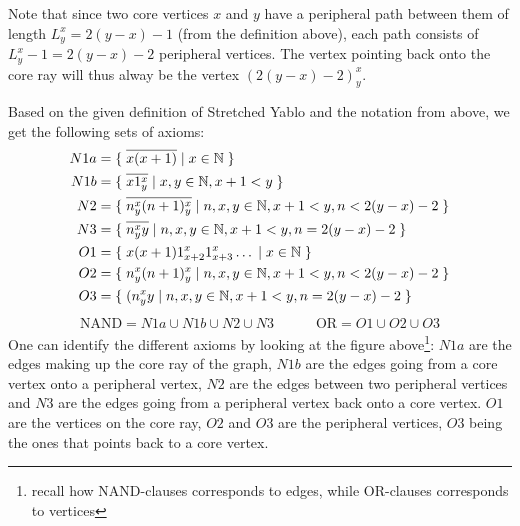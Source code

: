 Note that since two core vertices $x$ and $y$ have a peripheral path between them of length $L^x_y = 2(y-x) - 1$ (from the definition above), each path consists of $L^x_y - 1 = 2(y-x) - 2$ peripheral vertices.
The vertex pointing back onto the core ray will thus alway be the vertex $(2(y-x)-2)^x_y$.

Based on the given definition of Stretched Yablo and the notation from above, we get the following sets of axioms:
\begin{align}
  N1a &= \{\; \ol{x(x+1)} \;|\; x \in \mathbb{N} \; \} \\
	N1b &= \{\; \ol{x1^x_y} \;|\; x,y \in \mathbb{N}, x+1 < y \; \} \\
	N2 &= \{\; \ol{n^x_y(n+1)^x_y} \;|\; n,x,y \in \mathbb{N}, x+1 < y, n < 2(y-x) - 2 \; \} \\
	N3 &= \{\; \ol{n^x_yy} \;|\; n,x,y \in \mathbb{N}, x+1 < y, n = 2(y-x)-2 \; \} \\
	O1 &= \{\; x(x+1)1^x_{x+2}1^x_{x+3}\dots \;|\; x \in \mathbb{N} \; \} \\
  O2 &= \{\; n^x_y(n+1)^x_y \;|\; n,x,y \in \mathbb{N}, x+1 < y, n < 2(y-x) - 2 \; \} \\
	O3 &= \{\; (n^x_yy \;|\; n,x,y \in \mathbb{N}, x+1 < y, n = 2(y-x)-2 \; \}
\end{align}
\begin{align}
  \text{NAND} = N1a \cup N1b \cup N2 \cup N3 \quad\quad\quad \text{OR} = O1 \cup O2 \cup O3
\end{align}
One can identify the different axioms by looking at the figure above\footnote{recall how NAND-clauses corresponds to edges, while OR-clauses corresponds to vertices}:
$N1a$ are the edges making up the core ray of the graph, $N1b$ are the edges going from a core vertex onto a peripheral vertex, $N2$ are the edges between two peripheral vertices and $N3$ are the edges going from a peripheral vertex back onto a core vertex.
$O1$ are the vertices on the core ray, $O2$ and $O3$ are the peripheral vertices, $O3$ being the ones that points back to a core vertex.

